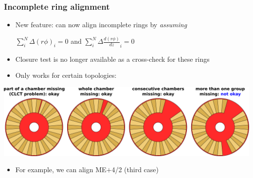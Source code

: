 \documentclass[compress]{beamer}
\begin{document}
\begin{frame}
\frametitle{Incomplete ring alignment}

\begin{itemize}\setlength{\itemsep}{0.2 cm}
\item New feature: can now align incomplete rings by {\it assuming}
\begin{center}
$\displaystyle \sum_i^N \Delta (r\phi)_i = 0$ \hspace{0.5 cm}and\hspace{0.5 cm} $\displaystyle \sum_i^N \Delta \frac{d(r\phi)}{dz}_i = 0$
\end{center}

\item Closure test is no longer available as a cross-check for these rings

\item Only works for certain topologies:
\end{itemize}

\vfill
\includegraphics[width=\linewidth]{incomplete_rings.pdf}

\begin{itemize}
\item For example, we can align ME$+$4/2 (third case)
\end{itemize}
\end{frame}

\end{document}
